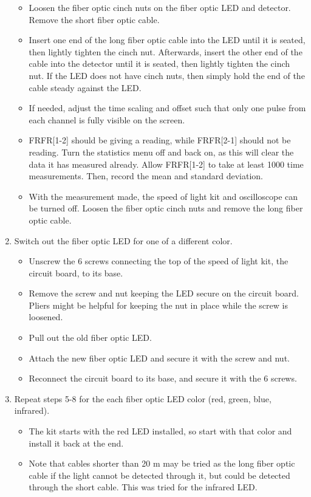 \documentclass[12pt]{iopart} %
\begin{document}
\begin{enumerate}
  \begin{itemize}
  \item
    Loosen the fiber optic cinch nuts on the fiber optic LED and
    detector. Remove the short fiber optic cable.
  \item
    Insert one end of the long fiber optic cable into the LED until it
    is seated, then lightly tighten the cinch nut. Afterwards, insert
    the other end of the cable into the detector until it is seated,
    then lightly tighten the cinch nut.
    If the LED does not have cinch nuts, then simply hold the end of the cable steady against the LED.
  \item
    If needed, adjust the time scaling and offset such that only one
    pulse from each channel is fully visible on the screen.
  \item
    FRFR{[}1-2{]} should be giving a reading, while FRFR{[}2-1{]} should
    not be reading. Turn the statistics menu off and back on, as this
    will clear the data it has measured already. Allow FRFR{[}1-2{]} to
    take at least 1000 time measurements. Then, record the mean and
    standard deviation.
  \item
    With the measurement made, the speed of light kit and oscilloscope
    can be turned off. Loosen the fiber optic cinch nuts and remove the
    long fiber optic cable.
  \end{itemize}
\item
  Switch out the fiber optic LED for one of a different color.

  \begin{itemize}
  \item
    Unscrew the 6 screws connecting the top of the speed of light kit,
    the circuit board, to its base.
  \item
    Remove the screw and nut keeping the LED secure on the circuit
    board. Pliers might be helpful for keeping the nut in place while
    the screw is loosened.
  \item
    Pull out the old fiber optic LED.
  \item
    Attach the new fiber optic LED and secure it with the screw and nut.
  \item
    Reconnect the circuit board to its base, and secure it with the 6
    screws.
  \end{itemize}
\item
  Repeat steps 5-8 for the each fiber optic LED color (red, green,
  blue, infrared).

  \begin{itemize}
  \item
    The kit starts with the red LED installed, so start with that color
    and install it back at the end.
  \item
    Note that cables shorter than 20 m may be tried as the long fiber optic cable if the light cannot be detected through it, but could be detected through the short cable.
    This was tried for the infrared LED.
  \end{itemize}
\end{enumerate}
\end{document}

